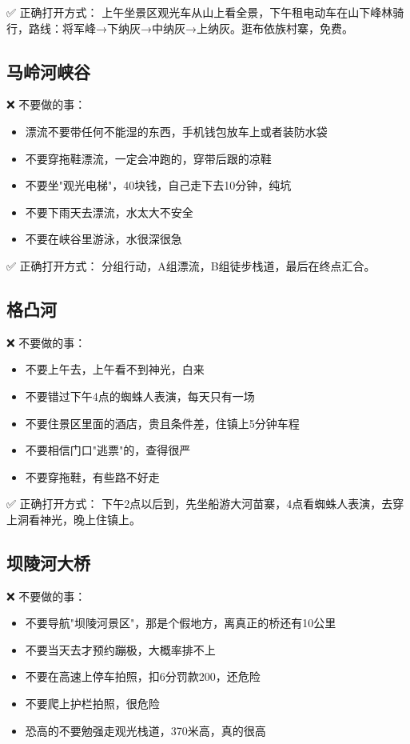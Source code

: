 \documentclass[12pt,a4paper,UTF8]{ctexart}
\begin{document}
✅ 正确打开方式：
上午坐景区观光车从山上看全景，下午租电动车在山下峰林骑行，路线：将军峰→下纳灰→中纳灰→上纳灰。逛布依族村寨，免费。

\subsection{马岭河峡谷}
❌ 不要做的事：
\begin{itemize}
\item 漂流不要带任何不能湿的东西，手机钱包放车上或者装防水袋
\item 不要穿拖鞋漂流，一定会冲跑的，穿带后跟的凉鞋
\item 不要坐"观光电梯"，40块钱，自己走下去10分钟，纯坑
\item 不要下雨天去漂流，水太大不安全
\item 不要在峡谷里游泳，水很深很急
\end{itemize}

✅ 正确打开方式：
分组行动，A组漂流，B组徒步栈道，最后在终点汇合。

\subsection{格凸河}
❌ 不要做的事：
\begin{itemize}
\item 不要上午去，上午看不到神光，白来
\item 不要错过下午4点的蜘蛛人表演，每天只有一场
\item 不要住景区里面的酒店，贵且条件差，住镇上5分钟车程
\item 不要相信门口"逃票"的，查得很严
\item 不要穿拖鞋，有些路不好走
\end{itemize}

✅ 正确打开方式：
下午2点以后到，先坐船游大河苗寨，4点看蜘蛛人表演，去穿上洞看神光，晚上住镇上。

\subsection{坝陵河大桥}
❌ 不要做的事：
\begin{itemize}
\item 不要导航"坝陵河景区"，那是个假地方，离真正的桥还有10公里
\item 不要当天去才预约蹦极，大概率排不上
\item 不要在高速上停车拍照，扣6分罚款200，还危险
\item 不要爬上护栏拍照，很危险
\item 恐高的不要勉强走观光栈道，370米高，真的很高
\end{itemize}
\end{document}
